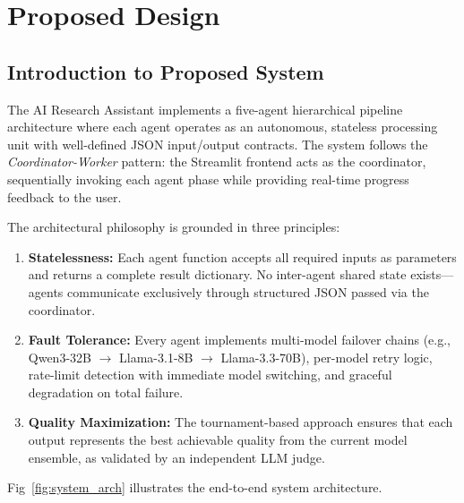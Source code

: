 \chapter{Proposed Design}

\section{Introduction to Proposed System}

The AI Research Assistant implements a five-agent hierarchical pipeline architecture where each agent operates as an autonomous, stateless processing unit with well-defined JSON input/output contracts. The system follows the \textit{Coordinator-Worker} pattern: the Streamlit frontend acts as the coordinator, sequentially invoking each agent phase while providing real-time progress feedback to the user.

The architectural philosophy is grounded in three principles:

\begin{enumerate}[label=\arabic*., leftmargin=2cm]
\item \textbf{Statelessness:} Each agent function accepts all required inputs as parameters and returns a complete result dictionary. No inter-agent shared state exists---agents communicate exclusively through structured JSON passed via the coordinator.

\item \textbf{Fault Tolerance:} Every agent implements multi-model failover chains (e.g., Qwen3-32B $\rightarrow$ Llama-3.1-8B $\rightarrow$ Llama-3.3-70B), per-model retry logic, rate-limit detection with immediate model switching, and graceful degradation on total failure.

\item \textbf{Quality Maximization:} The tournament-based approach ensures that each output represents the best achievable quality from the current model ensemble, as validated by an independent LLM judge.
\end{enumerate}

Fig~\ref{fig:system_arch} illustrates the end-to-end system architecture.

